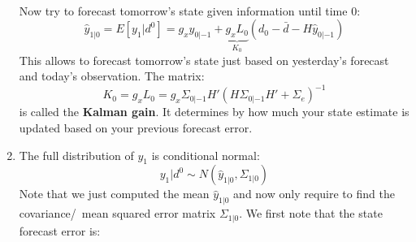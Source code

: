 \begin{enumerate}
\begin{multline*}
\end{multline*}
Now try to forecast tomorrow's state given information until time 0:
\begin{equation*}
\hat{y}_{1|0} = E[y_1|d^0] = g_x \hat{y}_{0|-1} + \underbrace{g_x L_0}_{K_0}\left(d_0-\bar{d}-H\hat{y}_{0|-1}\right)
\end{equation*}
This allows to forecast tomorrow's state just based on yesterday's forecast and today's observation.
The matrix:
\begin{equation*}
K_0 = g_x L_0 = g_x \Sigma_{0|-1} H'{\left(H\Sigma_{0|-1}H' + \Sigma_e\right)}^{-1}
\end{equation*}
is called the \textbf{Kalman gain}.
It determines by how much your state estimate is updated based on your previous forecast error.

\item The full distribution of \(y_1\) is conditional normal:
\begin{equation*}
y_1|d^0 \sim N(\hat{y}_{1|0},\Sigma_{1|0})
\end{equation*}
Note that we just computed the mean \(\hat{y}_{1|0}\) and now only require to find the covariance\slash~mean squared error matrix \(\Sigma_{1|0}\).
We first note that the state forecast error is:


\end{enumerate}
